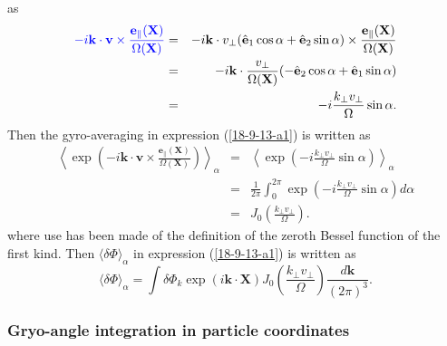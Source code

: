 \documentclass{llncs}
\newcommand{\tmcolor}[2]{{\color{#1}{#2}}}
\begin{document}
as
\begin{eqnarray}
  \tmcolor{blue}{- i\mathbf{k} \cdot \mathbf{v} \times
  \frac{\mathbf{e}_{\parallel} (\mathbf{X})}{\Omega (\mathbf{X})}} & = & -
  i\mathbf{k} \cdot v_{\perp} (\hat{\mathbf{e}}_1 \cos \alpha +
  \hat{\mathbf{e}}_2 \sin \alpha) \times \frac{\mathbf{e}_{\parallel}
  (\mathbf{X})}{\Omega (\mathbf{X})} \nonumber\\
  & = & - i\mathbf{k} \cdot \frac{v_{\perp}}{\Omega (\mathbf{X})} (-
  \hat{\mathbf{e}}_2 \cos \alpha + \hat{\mathbf{e}}_1 \sin \alpha) \nonumber\\
  & = & - i \frac{k_{\perp} v_{\perp}}{\Omega} \sin \alpha . 
  \label{18-9-12-e6}
\end{eqnarray}
Then the gyro-averaging in expression (\ref{18-9-13-a1}) is written as
\begin{eqnarray}
  \left\langle \exp \left( - i\mathbf{k} \cdot \mathbf{v} \times
  \frac{\mathbf{e}_{\parallel} (\mathbf{X})}{\Omega (\mathbf{X})} \right)
  \right\rangle_{\alpha} & = & \left\langle \exp \left( - i \frac{k_{\perp}
  v_{\perp}}{\Omega} \sin \alpha \right) \right\rangle_{\alpha} \nonumber\\
  & = & \frac{1}{2 \pi} \int_0^{2 \pi} \exp \left( - i \frac{k_{\perp}
  v_{\perp}}{\Omega} \sin \alpha \right) d \alpha \nonumber\\
  & = & J_0 \left( \frac{k_{\perp} v_{\perp}}{\Omega} \right) . 
\end{eqnarray}
where use has been made of the definition of the zeroth Bessel function of the
first kind. Then $\langle \delta \Phi \rangle_{\alpha}$ in expression
(\ref{18-9-13-a1}) is written as
\begin{equation}
  \label{18-9-12-e1} \langle \delta \Phi \rangle_{\alpha} = \int \delta \Phi_k
  \exp (i\mathbf{k} \cdot \mathbf{X}) J_0 \left( \frac{k_{\perp}
  v_{\perp}}{\Omega} \right) \frac{d\mathbf{k}}{(2 \pi)^3} .
\end{equation}

\subsubsection{Gryo-angle integration in particle coordinates}
\end{document}
